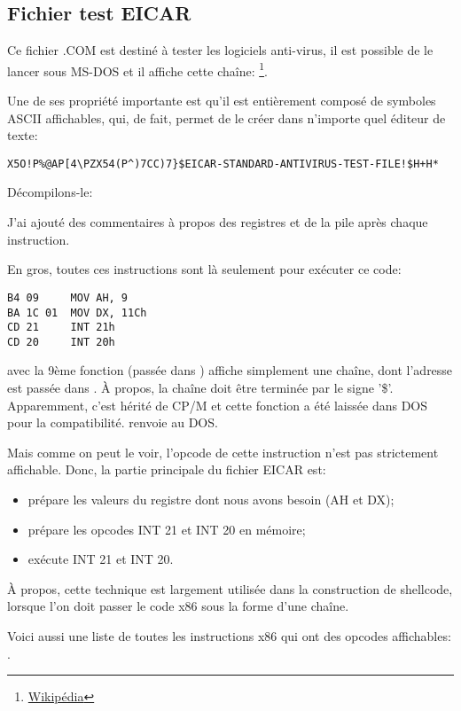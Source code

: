 
\subsection{ Fichier test EICAR}
\label{subsec:EICAR}

Ce fichier .COM est destiné à tester les logiciels anti-virus, il est possible de
le lancer sous MS-DOS et il affiche cette chaîne: 
\footnote{\href{https://en.wikipedia.org/wiki/EICAR_test_file}{Wikipédia}}.

Une de ses propriété importante est qu'il est entièrement composé de symboles ASCII
affichables, qui, de fait, permet de le créer dans n'importe quel éditeur de texte:

\begin{lstlisting}
X5O!P%@AP[4\PZX54(P^)7CC)7}$EICAR-STANDARD-ANTIVIRUS-TEST-FILE!$H+H*
\end{lstlisting}

Décompilons-le:



J'ai ajouté des commentaires à propos des registres et de la pile après chaque instruction.

En gros, toutes ces instructions sont là seulement pour exécuter ce code:

\begin{lstlisting}[style=customasmx86]
B4 09     MOV AH, 9
BA 1C 01  MOV DX, 11Ch
CD 21     INT 21h
CD 20     INT 20h
\end{lstlisting}

 avec la 9ème fonction (passée dans ) affiche simplement une chaîne,
dont l'adresse est passée dans .
À propos, la chaîne doit être terminée par le signe '\$'.
Apparemment, c'est hérité de \gls{CP/M} et cette fonction a été laissée dans DOS
pour la compatibilité.
 renvoie au DOS.

Mais comme on peut le voir, l'opcode de cette instruction n'est pas strictement
affichable.
Donc, la partie principale du fichier EICAR est:

\begin{itemize}
\item prépare les valeurs du registre dont nous avons besoin (AH et DX);
\item prépare les opcodes INT 21 et INT 20 en mémoire;
\item exécute INT 21 et INT 20.
\end{itemize}


À propos, cette technique est largement utilisée dans la construction de shellcode,
lorsque l'on doit passer le code x86 sous la forme d'une chaîne.

Voici aussi une liste de toutes les instructions x86 qui ont des opcodes affichables:
.
